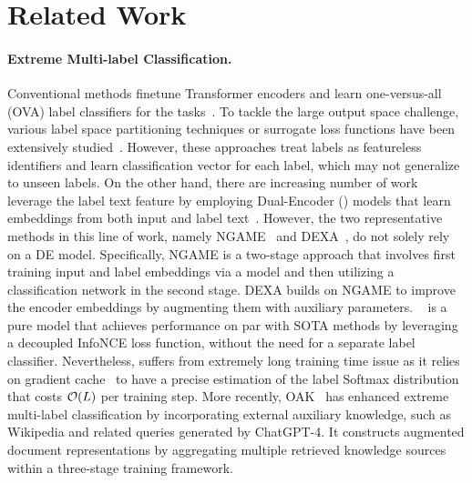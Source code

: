 \section{Related Work}

\vspace{-0.2em}
\paragraph{Extreme Multi-label Classification.}
Conventional \XMC methods finetune Transformer encoders and learn one-versus-all (OVA) label classifiers for the \XMC tasks~\citep{chang2020xmctransformer,zhang2021fast,kharbanda2022cascadexml}.
To tackle the large output space challenge, various label space partitioning techniques or surrogate loss functions have been extensively studied~\citep{prabhu2018parabel,jain2019slice,yu2022pecos}.
However, these approaches treat labels as featureless identifiers and learn classification vector for each label, which may not generalize to unseen labels.
On the other hand, there are increasing number of work leverage the label text feature by employing Dual-Encoder (\DE) models that learn embeddings from both input and label text~\citep{saini2021galaxc,mittal2021eclare,dahiya2021siamesexml,dahiya2023ngame,dahiya2023deep}.
However, the two representative methods in this line of work, namely NGAME~\citep{dahiya2023ngame} and DEXA~\citep{dahiya2023deep}, do not solely rely on a DE model.
Specifically, NGAME is a two-stage approach that involves first training input and label embeddings via a \DE model and then utilizing a classification network in the second stage. DEXA builds on NGAME to improve the encoder embeddings by augmenting them with auxiliary parameters.
\DEXML~\citep{gupta2024dual} is a pure \DE model that achieves performance on par with SOTA methods by leveraging a decoupled InfoNCE loss function, without the need for a separate label classifier.
Nevertheless, \DEXML suffers from extremely long training time issue as it relies on gradient cache~\citep{gao2021scaling} to have a precise estimation of the label Softmax distribution that costs ${\mathcal{O}}(L)$ per training step.
More recently, OAK~\cite{mohan2024oak} has enhanced extreme multi-label classification by incorporating external auxiliary knowledge, such as Wikipedia and related queries generated by ChatGPT-4. It constructs augmented document representations by aggregating multiple retrieved knowledge sources within a three-stage training framework.

\vspace{-0.2em}
